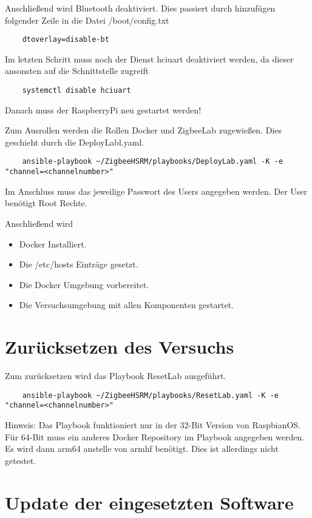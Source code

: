 Anschließend wird Bluetooth deaktiviert. Dies passiert durch hinzufügen folgender Zeile in die Datei \grqq /boot/config.txt\grqq{}
\begin{lstlisting}
    dtoverlay=disable-bt
\end{lstlisting}

Im letzten Schritt muss noch der Dienst \grqq hciuart\grqq{} deaktiviert werden, da dieser ansonsten auf die Schnittstelle zugreift
\begin{lstlisting}
    systemctl disable hciuart
\end{lstlisting}

Danach muss der RaspberryPi neu gestartet werden! 


Zum Ausrollen werden die Rollen \grqq Docker\grqq{} und \grqq ZigbeeLab\grqq{} zugewießen. Dies geschieht durch die DeployLabl.yaml.
\begin{lstlisting}
    ansible-playbook ~/ZigbeeHSRM/playbooks/DeployLab.yaml -K -e "channel=<channelnumber>"
\end{lstlisting}
Im Anschluss muss das jeweilige Passwort des Users angegeben werden. Der User benötigt Root Rechte.

Anschließend wird
\begin{itemize}
    \item Docker Installiert.
    \item Die /etc/hosts Einträge gesetzt.
    \item Die Docker Umgebung vorbereitet.
    \item Die Versuchsumgebung mit allen Komponenten gestartet.
\end{itemize}

\section{Zurücksetzen des Versuchs}

Zum zurücksetzen wird das Playbook \grqq ResetLab\grqq{} ausgeführt.

\begin{lstlisting}
    ansible-playbook ~/ZigbeeHSRM/playbooks/ResetLab.yaml -K -e "channel=<channelnumber>"
\end{lstlisting}
Hinweis: Das Playbook funktioniert nur in der 32-Bit Version von RaspbianOS. Für 64-Bit muss ein anderes Docker Repository im Playbook angegeben werden.
Es wird dann arm64 anstelle von armhf benötigt. Dies ist allerdings nicht getestet.

\section{Update der eingesetzten Software}

